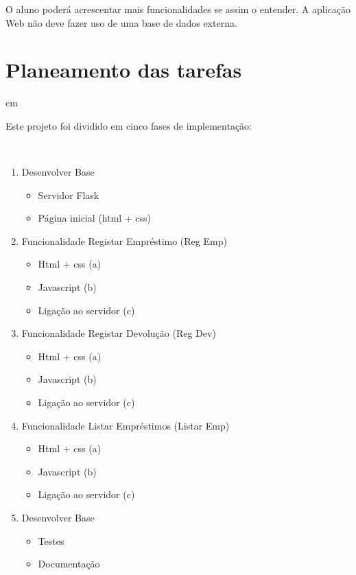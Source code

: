 \documentclass[12pt, a4paper, twoside]{article}
\begin{document}
O aluno poderá acrescentar mais funcionalidades se assim o entender. A aplicação Web não deve fazer uso de uma base de dados externa.

\newpage
\section{Planeamento das tarefas}
 cm

Este projeto foi dividido em cinco fases de implementação:

\\
\noindent
\begin{enumerate}
	\item Desenvolver Base
  	\begin{itemize}
		\item Servidor Flask
  		\item Página inicial (html + css)
  	\end{itemize}
  	\item Funcionalidade Registar Empréstimo (Reg Emp)
  	\begin{itemize}
  		\item Html + css (a)
  		\item Javascript (b)
  		\item Ligação ao servidor (c)
	\end{itemize}
	\item Funcionalidade Registar Devolução (Reg Dev)
  	\begin{itemize}
  		\item Html + css (a)
  		\item Javascript (b)
  		\item Ligação ao servidor (c)
	\end{itemize}
	\item Funcionalidade Listar Empréstimos (Listar Emp)
  	\begin{itemize}
  		\item Html + css (a)
  		\item Javascript (b)
  		\item Ligação ao servidor (c)
	\end{itemize}
	\item Desenvolver Base
  	\begin{itemize}
  		\item Testes
  		\item Documentação
	\end{itemize}
\end{enumerate}
\end{document}
